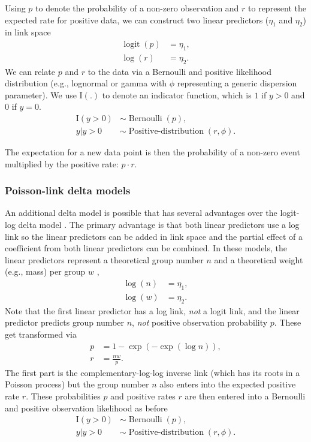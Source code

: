 \documentclass[article]{jss}\usepackage[]{graphicx}\usepackage[dvipsnames]{xcolor}
\begin{document}
Using $p$ to denote the probability of a non-zero observation and $r$ to represent the expected rate for positive data, we can construct two linear predictors ($\eta_1$ and $\eta_2$) in link space
\[
\begin{aligned}
\operatorname{logit} (p) &= \eta_1,\\
\log (r) &= \eta_2.
\end{aligned}
\]
We can relate $p$ and $r$ to the data via a Bernoulli and positive likelihood distribution (e.g., lognormal or gamma with $\phi$ representing a generic dispersion parameter).
We use $\mathrm{I}(.)$ to denote an indicator function, which is $1$ if $y > 0$ and 0 if $y = 0$.
\[
\begin{aligned}
\mathrm{I}(y > 0) &\sim \operatorname{Bernoulli} \left( p \right),\\
y | y > 0 &\sim \operatorname{Positive-distribution} \left( r, \phi \right).
\end{aligned}
\]

The expectation for a new data point is then the probability of a non-zero event multiplied by the positive rate: $p \cdot r$.

\subsubsection{Poisson-link delta models}

An additional delta model is possible that has several advantages over the logit-log delta model \citep{thorson2018poisson}.
The primary advantage is that both linear predictors use a log link so the linear predictors can be added in link space and the partial effect of a coefficient from both linear predictors can be combined.
In these models, the linear predictors represent a theoretical group number $n$ and a theoretical weight (e.g., mass) per group $w$ \citep{thorson2018poisson},
\[
\begin{aligned}
\log (n) &= \eta_1,\\
\log (w) &= \eta_2.
\end{aligned}
\]
Note that the first linear predictor has a log link, \emph{not} a logit link, and the linear predictor predicts group number $n$, \emph{not} positive observation probability $p$.
These get transformed \citep{thorson2018poisson} via
\[
\begin{aligned}
p &= 1 - \exp(- \exp( \log n)),\\
r &= \frac{n w}{p}.
\end{aligned}
\]
The first part is the complementary-log-log inverse link \citep[][p.~31]{mccullagh1989} (which has its roots in a Poisson process) but the group number $n$ also enters into the expected positive rate $r$.
These probabilities $p$ and positive rates $r$ are then entered into a Bernoulli and positive observation likelihood as before
\[
\begin{aligned}
\mathrm{I}(y > 0) &\sim \operatorname{Bernoulli} \left( p \right),\\
y | y > 0 &\sim \operatorname{Positive-distribution} \left( r, \phi \right).
\end{aligned}
\]
\end{document}
